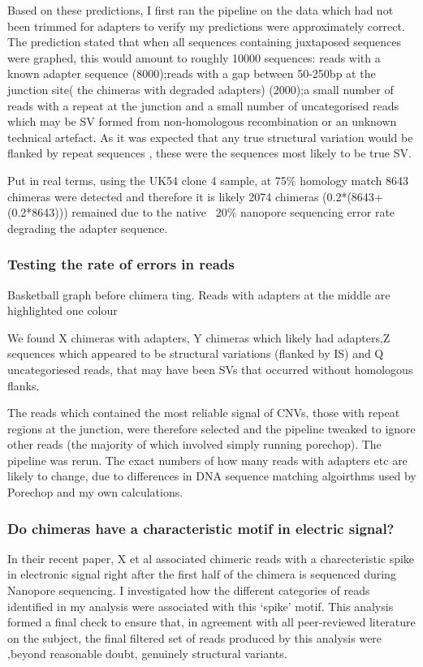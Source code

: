 Based on these predictions, I first ran the pipeline on the data which had not been trimmed for adapters to verify my predictions were approximately correct. The prediction stated that when all sequences containing juxtaposed sequences were graphed, this would amount to roughly 10000 sequences: reads with a known adapter sequence (8000);reads with a gap between 50-250bp at the junction site( the chimeras with degraded adapters) (2000);a small number of reads with a repeat at the junction and a small number of uncategorised reads which may be SV formed from non-homologous recombination or an unknown technical artefact. As it was expected that any true structural variation would be flanked by repeat sequences , these were the sequences most likely to be true SV.


Put in real terms, using the UK54 clone 4 sample, at 75\% homology match 8643 chimeras were detected and therefore it is likely 2074 chimeras (0.2*(8643+(0.2*8643))) remained due to the native ~20\% nanopore sequencing error rate degrading the adapter sequence.


\subsubsection{Testing the rate of errors in reads}


{Basketball graph before chimera ting. Reads with adapters at the middle are highlighted one colour}


We found X chimeras with adapters, Y chimeras which likely had adapters,Z sequences which appeared to be structural variations (flanked by IS) and Q uncategoriesed reads, that may have been SVs that occurred without homologous flanks. 


The reads which contained the most reliable signal of CNVs, those with repeat regions at the junction, were therefore selected and the pipeline tweaked to ignore other reads (the majority of which involved simply running porechop). The pipeline was rerun. The exact numbers of how many reads with adapters etc are likely to change, due to differences in DNA sequence matching algoirthms used by Porechop and my own calculations. 

\subsubsection{Do chimeras have a characteristic motif in electric signal?}
 In their recent paper, X et al associated chimeric reads with a charecteristic spike in electronic signal right after the first half of the chimera is sequenced during Nanopore sequencing. I investigated how the different categories of reads identified in my analysis were associated with this `spike' motif. This analysis formed a final check to ensure that, in agreement with all peer-reviewed literature on the subject, the final filtered set of reads produced by this analysis were ,beyond reasonable doubt, genuinely structural variants.

